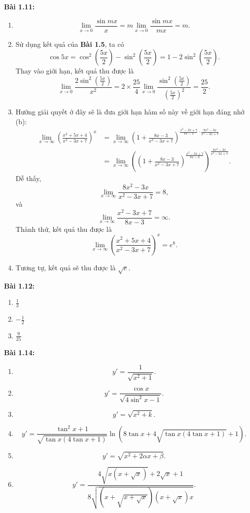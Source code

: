 \textbf{Bài 1.11:}
\begin{enumerate}[label=(\alph*)]
\item \[\lim_{x\rightarrow 0}\frac{\sin mx}{x}=m\lim_{x\rightarrow 0}\frac{\sin mx}{mx}=m.\]
\item Sử dụng kết quả của \textbf{Bài 1.5}, ta có \[\cos 5x =\cos^2 \left(\frac{5x}{2}\right)-\sin^2\left(\frac{5x}{2}\right)=1-2\sin^2\left(\frac{5x}{2}\right).\] Thay vào giới hạn, kết quả thu được là \[\lim_{x\rightarrow 0}\frac{2\sin^2\left(\frac{5x}{2}\right)}{x^2}=2\times\frac{25}{4}\lim_{x\rightarrow 0}\frac{\sin^2 \left(\frac{5x}{2}\right)}{\left(\frac{5x}{2}\right)^2}=\frac{25}{2}.\]
\item Hướng giải quyết ở đây sẽ là đưa giới hạn hàm số này về giới hạn đáng nhớ (b): 
\begin{align*}
    \lim_{x\rightarrow\infty}\left(\frac{x^2+5x+4}{x^2-3x+7}\right)^x&=\lim_{x\rightarrow\infty}\left(1+\frac{8x-3}{x^2 -3x+7}\right)^{\frac{x^2-3x+7}{8x-3}\cdot\frac{8x^2-3x}{x^2-3x+7}}\\ &=
\lim_{x\rightarrow\infty}\left(\left(1+\frac{8x-3}{x^2 -3x+7}\right)^{\frac{x^2-3x+7}{8x-3}}\right)^{\frac{8x^2-3x}{x^2-3x+7}}.
\end{align*}
 Dễ thấy, \[\lim_{x\rightarrow\infty}\frac{8x^2-3x}{x^2-3x+7}=8,\] và \[\lim_{x\rightarrow\infty}\frac{x^2-3x+7}{8x-3}=\infty.\] Thành thử, kết quả thu được là \[\lim_{x\rightarrow\infty}\left(\frac{x^2+5x+4}{x^2-3x+7}\right)^x=e^8.\] 
\item Tương tự, kết quả sẽ thu được là \(\sqrt{e}\).
\end{enumerate}
\vspace{5pt}

\textbf{Bài 1.12:}  
\begin{enumerate}[label=(\alph*)]   
    \item \(\frac{1}{3}\)
    \item \(-\frac{1}{2}\)
    \item \(\frac{9}{25}\)
\end{enumerate}
\vspace{5pt}

\textbf{Bài 1.14:}
\begin{enumerate}[label=(\alph*)]
\item \[y' =\frac{1}{\sqrt{x^2+1}}.\]
\item \[y'= \frac{\cos x}{\sqrt{4\sin^2 x -1}}.\]
\item \[y'= \sqrt{x^2+k}.\]
\item \[y'=\frac{\tan^2 x+1}{\sqrt{\tan x (4\tan x +1)}}\ln \left(8\tan x +4\sqrt{\tan x (4\tan x +1)}+1\right).\]
\item \[y'=\sqrt{x^2 +2\alpha x +\beta}.\]
\item \[y'=\frac{4\sqrt{x\left(x+\sqrt{x}\right)}+2\sqrt{x}+1}{8\sqrt{\left(x+\sqrt{x+\sqrt{x}}\right)(x+\sqrt{x})x}}.\]
\end{enumerate}  